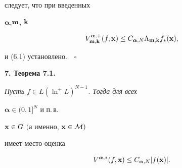 следует, что при введенных 


$\boldsymbol\alpha$,\linebreak $\bold m$, $\bold k$ 


$$


V_{{\bold m},{\bold k}}^{\boldsymbol \alpha,+}(f,{\bold x})


\le C_{{\boldsymbol{\alpha}},N}\Lambda_{{\bold m},{\bold k}} f_*({\bold x}),


$$


и (6.1) установлено.$\quad\square$


\medskip





\addtocounter{section}{1}


\setcounter{equation}{0}


\setcounter{lems}{0}


\setcounter{thms}{0}





 


{\bf 7. Теорема 7.1.} {\it Пусть $f\in L(\ln^+L)^{N-1}$. Тогда для всех


${\boldsymbol {\alpha}}\in (0,1]^N$ и п.\,в. 


${\bold x}\in G$ $($а именно, ${\bold x}\in {\cal M})$


имеет место оценка}


\begin{equation}


V^{{\boldsymbol {\alpha}},*}(f,{\bold x})\le C_{{\boldsymbol {\alpha}},N} |f({\bold x})|.


\end{equation}





